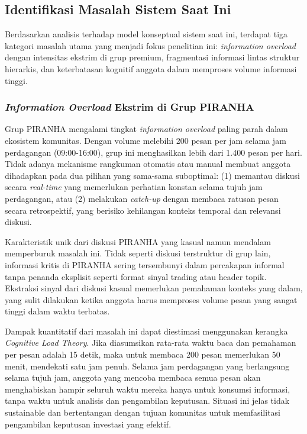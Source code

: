 \subsection{Identifikasi Masalah Sistem Saat Ini}

Berdasarkan analisis terhadap model konseptual sistem saat ini, terdapat tiga kategori masalah utama yang menjadi fokus penelitian ini: \textit{information overload} dengan intensitas ekstrim di grup premium, fragmentasi informasi lintas struktur hierarkis, dan keterbatasan kognitif anggota dalam memproses volume informasi tinggi.

\subsubsection{\textit{Information Overload} Ekstrim di Grup PIRANHA}

Grup PIRANHA mengalami tingkat \textit{information overload} paling parah dalam ekosistem komunitas. Dengan volume melebihi 200 pesan per jam selama jam perdagangan (09:00-16:00), grup ini menghasilkan lebih dari 1.400 pesan per hari. Tidak adanya mekanisme rangkuman otomatis atau manual membuat anggota dihadapkan pada dua pilihan yang sama-sama suboptimal: (1) memantau diskusi secara \textit{real-time} yang memerlukan perhatian konstan selama tujuh jam perdagangan, atau (2) melakukan \textit{catch-up} dengan membaca ratusan pesan secara retrospektif, yang berisiko kehilangan konteks temporal dan relevansi diskusi.

Karakteristik unik dari diskusi PIRANHA yang kasual namun mendalam memperburuk masalah ini. Tidak seperti diskusi terstruktur di grup lain, informasi kritis di PIRANHA sering tersembunyi dalam percakapan informal tanpa penanda eksplisit seperti format sinyal trading atau header topik. Ekstraksi sinyal dari diskusi kasual memerlukan pemahaman konteks yang dalam, yang sulit dilakukan ketika anggota harus memproses volume pesan yang sangat tinggi dalam waktu terbatas.

Dampak kuantitatif dari masalah ini dapat diestimasi menggunakan kerangka \textit{Cognitive Load Theory}. Jika diasumsikan rata-rata waktu baca dan pemahaman per pesan adalah 15 detik, maka untuk membaca 200 pesan memerlukan 50 menit, mendekati satu jam penuh. Selama jam perdagangan yang berlangsung selama tujuh jam, anggota yang mencoba membaca semua pesan akan menghabiskan hampir seluruh waktu mereka hanya untuk konsumsi informasi, tanpa waktu untuk analisis dan pengambilan keputusan. Situasi ini jelas tidak sustainable dan bertentangan dengan tujuan komunitas untuk memfasilitasi pengambilan keputusan investasi yang efektif.

